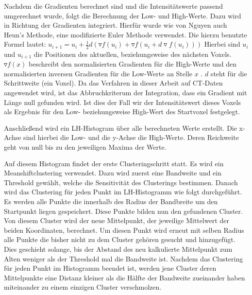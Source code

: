 Nachdem die Gradienten berechnet sind und die Intensitätswerte passend umgerechnet wurde, folgt die Berechnung der Low- und High-Werte. Dazu wird in Richtung der Gradienten integriert. Hierfür wurde wie von Nguyen auch Heun's Methode, eine modifizierte Euler Methode verwendet. Die hierzu benutzte Formel lautet:
\newline
$u_{i+1} = u_{i} + \frac{1}{2}d(\triangledown f (u_{i}) + \triangledown f(u_{i}+d \triangledown f(u_{i}))) $
\newline
Hierbei sind $u_{i}$ und $u_{i+1}$ die Positionen des aktuellen, beziehungsweise des nächsten Voxels. $\triangledown f(x)$ beschreibt den normalisierten Gradienten für die High-Werte und den normalisierten inversen Gradienten für die Low-Werte an Stelle $x$ . $d$ steht für die Schrittweite (ein Voxel).
Da das Verfahren in dieser Arbeit auf CT-Daten angewendet wird, ist das Abbruchkriterum der Integration, dass ein Gradient mit Länge null gefunden wird. Ist dies der Fall wir der Intensitätswert dieses Voxels als Ergebnis für den Low- beziehungsweise High-Wert des Startvoxel festgelegt.


Anschließend wird ein LH-Histogram über alle berechneten Werte erstellt. Die x-Achse sind hierbei die Low- und die y-Achse die High-Werte. Deren Reichweite geht von null bis zu den jeweiligen Maxima der Werte.

Auf diesem Histogram findet der erste Clusteringschritt  statt. Es wird ein Meanshiftclustering verwendet. Dazu wird zuerst eine Bandweite und ein Threshold gewählt, welche die Sensitivität des Clusterings bestimmen. Danach wird das Clustering für jeden Punkt im LH-Histogramm wie folgt durchgeführt.
\newline
Es werden alle Punkte die innerhalb des Radius der Bandbreite um den Startpunkt liegen gespeichert. Diese Punkte bilden nun den gefundenen Cluster. Von diesem Cluster wird der neue Mittelpunkt, der jeweilige Mittelwert der beiden Koordinaten, berechnet. Um diesen Punkt wird erneut mit selben Radius alle Punkte die bisher nicht zu dem Cluster gehören gesucht und hinzugefügt. Dies geschieht solange, bis der Abstand des neu kalkulierte Mittelpunkt zum Alten weniger als der Threshold mal die Bandweite ist. 
Nachdem das Clustering für jeden Punkt im Histogramm beendet ist, werden jene Cluster deren Mittelpunkte eine Distanz kleiner als die Hälfte der Bandweite zueinander haben miteinander zu einem einzigen Cluster verschmolzen.


